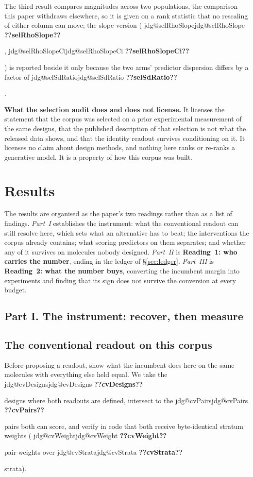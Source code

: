 \documentclass[11pt]{article}
\makeatletter
\newcommand{\jdg}[1]{%
  \ifcsname jdg@#1\endcsname\csname jdg@#1\endcsname
  \else\textbf{??#1??}\PackageError{nm}{undefined measured quantity #1}{}\fi}
\makeatother
\begin{document}
The third result compares magnitudes across two populations, the comparison this paper withdraws
elsewhere, so it is given on a rank statistic that no rescaling of either column can move; the
slope version (\jdg{selRhoSlope}, \jdg{selRhoSlopeCi}) is reported beside it only because the two
arms' predictor dispersion differs by a factor of \jdg{selSdRatio}.

\begin{scopebox}
\textbf{What the selection audit does and does not license.} It licenses the statement that the
corpus was selected on a prior experimental measurement of the same designs, that the published
description of that selection is not what the released data shows, and that the identity readout
survives conditioning on it. It licenses no claim about design methods, and nothing here ranks or
re-ranks a generative model. It is a property of how this corpus was built.
\end{scopebox}


\section{Results}
\label{sec:results}

\noindent The results are organised as the paper's two readings rather than as a list of findings.
\emph{Part~I} establishes the instrument: what the conventional readout can still resolve here,
which sets what an alternative has to beat; the interventions the corpus already contains; what
scoring predictors on them separates; and whether any of it survives on molecules nobody designed.
\emph{Part~II} is \textbf{Reading~1: who carries the number}, ending in the ledger of
\S\ref{sec:ledger}. \emph{Part~III} is \textbf{Reading~2: what the number buys}, converting the
incumbent margin into experiments and finding that its sign does not survive the conversion at
every budget.

\subsection*{Part I. The instrument: recover, then measure}

\subsection{The conventional readout on this corpus}
\label{sec:conventional}

Before proposing a readout, show what the incumbent does here on the same molecules with everything
else held equal. We take the \jdg{cvDesigns} designs where both readouts are defined, intersect to
the \jdg{cvPairs} pairs both can score, and verify in code that both receive byte-identical stratum
weights (\jdg{cvWeight} pair-weights over
\jdg{cvStrata} strata).
\end{document}
